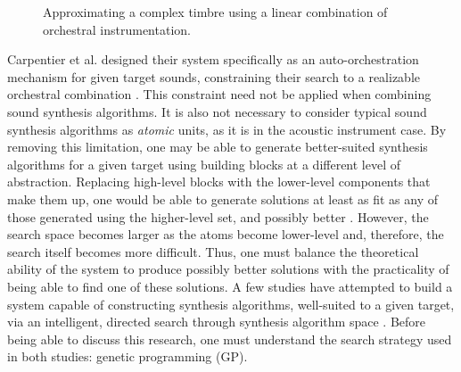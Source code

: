 \documentclass[a4paper,12pt]{report} 	%
\numberwithin{figure}{chapter}
\numberwithin{table}{chapter}
\numberwithin{equation}{chapter}
\begin{document}
\begin{flushleft}
\begin{figure}[h!]
\begin{center}
\caption[Searching for an Appropriate Linear Combination of Orchestral Instruments]{Approximating a complex timbre using a linear combination of orchestral instrumentation.}
\end{center}
\end{figure}
Carpentier et al. designed their system specifically as an auto-orchestration mechanism for given target sounds, constraining their search to a realizable orchestral combination \cite{Carpentier:2010fh}. This constraint need not be applied when combining sound synthesis algorithms. It is also not necessary to consider typical sound synthesis algorithms as \emph{atomic} units, as it is in the acoustic instrument case. By removing this limitation, one may be able to generate better-suited synthesis algorithms for a given target using building blocks at a different level of abstraction. Replacing high-level blocks with the lower-level components that make them up, one would be able to generate solutions at least as fit as any of those generated using the higher-level set, and possibly better \cite[p. 2]{Garcia:2000th}. However, the search space becomes larger as the atoms become lower-level and, therefore, the search itself becomes more difficult. Thus, one must balance the theoretical ability of the system to produce possibly better solutions with the practicality of being able to find one of these solutions. A few studies have attempted to build a system capable of constructing synthesis algorithms, well-suited to a given target, via an intelligent, directed search through synthesis algorithm space \cite{Wehn:1998bh, Garcia:2000th, Garcia:2002cq}. Before being able to discuss this research, one must understand the search strategy used in both studies: genetic programming (GP).


\end{flushleft}
\end{document}
